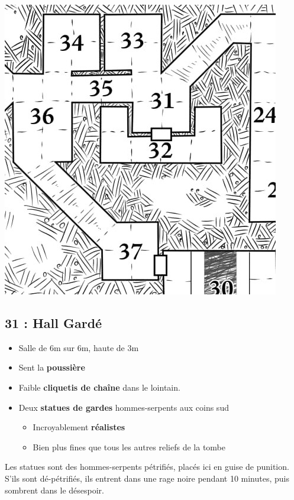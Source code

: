 \includegraphics[width=\columnwidth]{pics/map_31-37.jpg}

\subsection{31 : Hall Gardé}\label{n3:s31}
\begin{itemize}
  \item Salle de 6m sur 6m, haute de 3m
  \item Sent la \textbf{poussière}
  \item Faible \textbf{cliquetis de chaîne} dans le lointain.
  \item Deux \textbf{statues de gardes} hommes-serpents aux coins sud
  \begin{itemize}
    \item Incroyablement \textbf{réalistes}
    \item Bien plus fines que tous les autres reliefs de la tombe
  \end{itemize}
\end{itemize}

Les statues sont des hommes-serpents pétrifiés, placés ici en guise de punition.
S'ils sont dé-pétrifiés, ils entrent dans une rage noire pendant 10 minutes, puis sombrent dans le désespoir.

